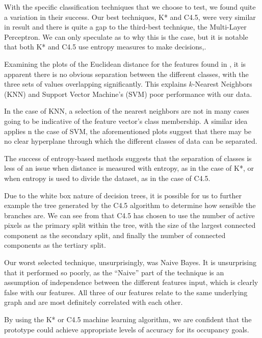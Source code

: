 \documentclass[../thesis/thesis.tex]{subfiles}
\begin{document}
With the specific classification techniques that we choose to test, we found quite a variation in their success. Our best techniques, K* and C4.5, were very similar in result and there is quite a gap to the third-best technique, the Multi-Layer Perceptron. We can only speculate as to why this is the case, but it is notable that both K* and C4.5 use entropy measures to make decisions,.

Examining the plots of the Euclidean distance for the features found in , it is apparent there is no obvious separation between the different classes, with the three sets of values overlapping significantly. This explains $k$-Nearest Neighbors (KNN) and Support Vector Machine's (SVM) poor performance with our data.

In the case of KNN, a selection of the nearest neighbors are not in many cases going to be indicative of the feature vector's class membership. A similar idea applies n the case of SVM, the aforementioned plots suggest that there may be no clear hyperplane through which the different classes of data can be separated.

The success of entropy-based methods suggests that the separation of classes is less of an issue when distance is measured with entropy, as in the case of K*, or when entropy is used to divide the dataset, as in the case of C4.5. %

Due to the white box nature of decision trees, it is possible for us to further example the tree generated by the C4.5 algorithm  to determine how sensible the branches are. We can see from  that C4.5 has chosen to use the number of active pixels as the primary split within the tree, with the size of the largest connected component as the secondary split, and finally the number of connected components as the tertiary split. %

Our worst selected technique, unsurprisingly, was Naive Bayes. It is unsurprising that it performed so poorly, as the ``Naive'' part of the technique is an assumption of independence between the different features input, which is clearly false with our features. All three of our features relate to the same underlying graph and are most definitely correlated with each other.

By using the K* or C4.5 machine learning algorithm, we are confident that the prototype could achieve appropriate levels of accuracy for its occupancy goals.
\end{document}
